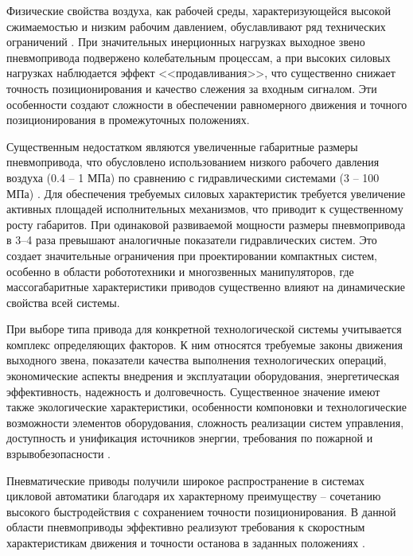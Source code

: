 Физические свойства воздуха, как рабочей среды, характеризующейся высокой
сжимаемостью и низким рабочим давлением, обуславливают ряд технических ограничений \cite{tugengold:a}.
При значительных инерционных нагрузках выходное звено пневмопривода подвержено колебательным процессам, а
при высоких силовых нагрузках наблюдается эффект <<продавливания>>, что существенно снижает точность позиционирования
и качество слежения за входным сигналом. Эти особенности создают сложности в обеспечении равномерного
движения и точного позиционирования в промежуточных положениях.

Существенным недостатком являются увеличенные габаритные размеры пневмопривода, что обусловлено
использованием низкого рабочего давления воздуха (\num{0.4} -- \num{1} МПа) по
сравнению с гидравлическими системами (\num{3} -- \num{100} МПа) \cite{tugengold:a}.
Для обеспечения требуемых силовых характеристик требуется увеличение активных площадей исполнительных
механизмов, что приводит к существенному росту габаритов. При одинаковой развиваемой мощности
размеры пневмопривода в 3--4 раза превышают аналогичные показатели гидравлических
систем. Это создает значительные ограничения при проектировании компактных систем,
особенно в области робототехники и многозвенных манипуляторов, где массогабаритные характеристики приводов существенно влияют на динамические свойства всей системы.

При выборе типа привода для конкретной технологической системы учитывается комплекс определяющих факторов.
К ним относятся требуемые законы движения выходного звена, показатели качества выполнения технологических операций, экономические
аспекты внедрения и эксплуатации оборудования, энергетическая эффективность, надежность и долговечность. Существенное значение имеют
также экологические характеристики, особенности компоновки и технологические возможности элементов оборудования, сложность реализации
систем управления, доступность и унификация источников энергии, требования по пожарной и взрывобезопасности
\cite{zisser2013position,takemura2000hybrid,vladur2016dynamic}.

Пневматические приводы получили широкое распространение в системах цикловой
автоматики благодаря их характерному преимуществу -- сочетанию высокого быстродействия
с сохранением точности позиционирования. В данной области
пневмоприводы эффективно реализуют требования к скоростным
характеристикам движения и точности останова в заданных положениях
\cite{hildebrandt2010optimal,carducci2006viscous,salim2015control}.

